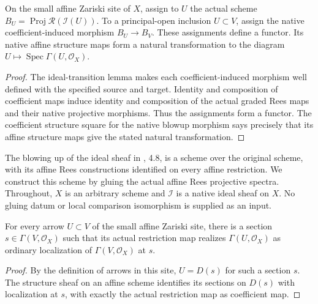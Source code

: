 \begin{definition}
\label{def:blowup-gluing-affine-diagram}
\leanok
On the small affine Zariski site of $X$, assign to $U$ the actual
scheme $B_U=\operatorname{Proj}\mathcal R(\mathcal I(U))$.
To a principal-open inclusion $U\subset V$, assign the native
coefficient-induced morphism $B_U\to B_V$. These assignments define a
functor. Its native affine structure maps form a natural transformation
to the diagram $U\mapsto\operatorname{Spec}\Gamma(U,\mathcal O_X)$.
\end{definition}
\begin{proof}
The ideal-transition lemma makes each coefficient-induced morphism
well defined with the specified source and target. Identity and
composition of coefficient maps induce identity and composition of
the actual graded Rees maps and their native projective morphisms.
Thus the assignments form a functor. The coefficient structure square
for the native blowup morphism says precisely that its affine
structure maps give the stated natural transformation.
\end{proof}

\endgroup

\begingroup

The blowing up of the ideal sheaf in \cite{deJong1996}, 4.8, is a
scheme over the original scheme, with its affine Rees constructions
identified on every affine restriction. We construct this scheme by
gluing the actual affine Rees projective spectra. Throughout, $X$ is
an arbitrary scheme and $\mathcal I$ is a native ideal sheaf on $X$.
No gluing datum or local comparison isomorphism is supplied as an input.

\begin{lemma}
\label{lem:blowup-gluing-coefficient-localization}
\leanok
For every arrow $U\subset V$ of the small affine Zariski site, there
is a section $s\in\Gamma(V,\mathcal O_X)$ such that its actual
restriction map realizes $\Gamma(U,\mathcal O_X)$ as ordinary
localization of $\Gamma(V,\mathcal O_X)$ at $s$.
\end{lemma}
\begin{proof}
By the definition of arrows in this site, $U=D(s)$ for such a
section $s$. The structure sheaf on an affine scheme identifies its
sections on $D(s)$ with localization at $s$, with exactly the actual
restriction map as coefficient map.
\end{proof}

